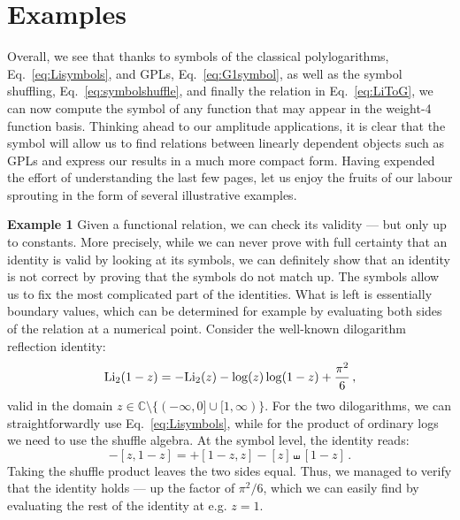\documentclass[main.tex]{subfiles}
\begin{document}
\section{Examples}
Overall, we see that thanks to symbols of the classical polylogarithms, Eq.~\ref{eq:Lisymbols}, and GPLs, Eq.~\ref{eq:G1symbol}, as well as the symbol shuffling, Eq.~\ref{eq:symbolshuffle}, and finally the relation in Eq.~\ref{eq:LiToG}, we can now compute the symbol of any function that may appear in the weight-4 function basis. Thinking ahead to our amplitude applications, it is clear that the symbol will allow us to find relations between linearly dependent objects such as GPLs and express our results in a much more compact form. Having expended the effort of understanding the last few pages, let us enjoy the fruits of our labour sprouting in the form of several illustrative examples.

\textbf{Example 1} \newline
Given a functional relation, we can check its validity --- but only up to constants. More precisely, while we can never prove with full certainty that an identity is valid by looking at its symbols, we can definitely show that an identity is not correct by proving that the symbols do not match up. The symbols allow us to fix the most complicated part of the identities. What is left is essentially boundary values, which can be determined for example by evaluating both sides of the relation at a numerical point. Consider the well-known dilogarithm reflection identity:
\begin{equation}
    \text{Li}_2(1-z) =- \text{Li}_2(z) -\log(z) \log(1-z) + \frac{\pi^2}{6} \,,
\end{equation}
valid in the domain $z \in \mathbb{C} \setminus\{(-\infty, 0] \cup [1, \infty)\}$. For the two dilogarithms, we can straightforwardly use Eq.~\ref{eq:Lisymbols}, while for the product of ordinary logs we need to use the shuffle algebra. At the symbol level, the identity reads:
\begin{equation}
    -[z,1-z] = + [1-z,z] - [z] \shuffle [1-z]\,.
\end{equation}
Taking the shuffle product leaves the two sides equal. Thus, we managed to verify that the identity holds --- up the factor of $\pi^2/6$, which we can easily find by evaluating the rest of the identity at e.g. $z=1$.
\end{document}
